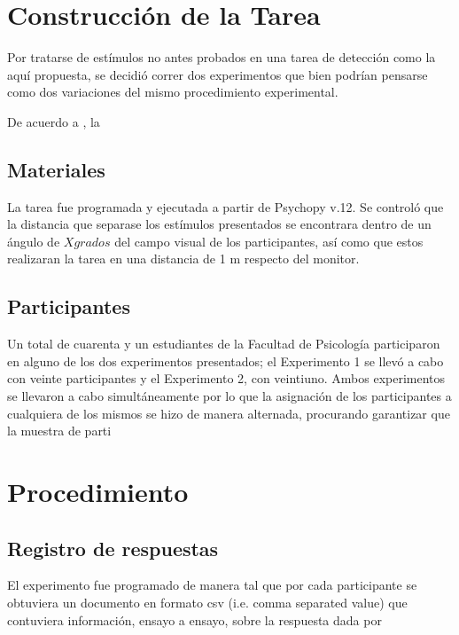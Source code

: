 \section{Construcción de la Tarea}

Por tratarse de estímulos no antes probados en una tarea de detección como la aquí propuesta, se decidió correr dos experimentos que bien podrían pensarse como dos variaciones del mismo procedimiento experimental. 

De acuerdo a \parencite{Massaro1971}, la 






\subsection{Materiales}
La tarea fue programada y ejecutada a partir de Psychopy v.12. Se controló que la distancia que separase los estímulos presentados se encontrara dentro de un ángulo de $X grados$ del campo visual de los participantes, así como que estos realizaran la tarea en una distancia de 1 m respecto del monitor.


\subsection{Participantes}

Un total de cuarenta y un estudiantes de la Facultad de Psicología participaron en alguno de los dos experimentos presentados; el Experimento 1 se llevó a cabo con veinte participantes y el Experimento 2, con veintiuno. Ambos experimentos se llevaron a cabo simultáneamente por lo que la asignación de los participantes a cualquiera de los mismos se hizo de manera alternada, procurando garantizar que la muestra de parti

\section{Procedimiento}



\subsection{Registro de respuestas}

El experimento fue programado de manera tal que por cada participante se obtuviera un documento en formato csv (i.e. comma separated value) que contuviera información, ensayo a ensayo, sobre la respuesta dada por 

